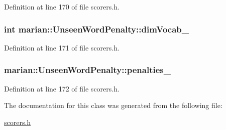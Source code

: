 Definition at line 170 of file scorers.\+h.

\subsubsection[{\texorpdfstring{dim\+Vocab\+\_\+}{dimVocab_}}]{\setlength{\rightskip}{0pt plus 5cm}int marian\+::\+Unseen\+Word\+Penalty\+::dim\+Vocab\+\_\+\hspace{0.3cm}{\ttfamily [private]}}\hypertarget{classmarian_1_1UnseenWordPenalty_afe88c9dd2190a71ab2c214b60252b6b8}{}\label{classmarian_1_1UnseenWordPenalty_afe88c9dd2190a71ab2c214b60252b6b8}


Definition at line 171 of file scorers.\+h.

\subsubsection[{\texorpdfstring{penalties\+\_\+}{penalties_}}]{ marian\+::\+Unseen\+Word\+Penalty\+::penalties\+\_\+\hspace{0.3cm}{\ttfamily [private]}}\hypertarget{classmarian_1_1UnseenWordPenalty_ac9cf380e25302b50550cee8a332ba17d}{}\label{classmarian_1_1UnseenWordPenalty_ac9cf380e25302b50550cee8a332ba17d}


Definition at line 172 of file scorers.\+h.



The documentation for this class was generated from the following file\+:\begin{DoxyCompactItemize}
\item 
\hyperlink{scorers_8h}{scorers.\+h}\end{DoxyCompactItemize}
